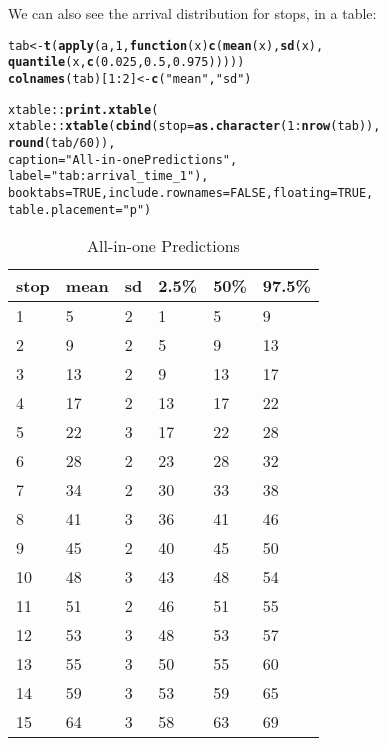 \documentclass[11pt]{article}\usepackage[]{graphicx}\usepackage[]{color}
\makeatletter
\newcommand{\hlnum}[1]{\textcolor[rgb]{0.686,0.059,0.569}{#1}}%
\newcommand{\hlstr}[1]{\textcolor[rgb]{0.192,0.494,0.8}{#1}}%
\newcommand{\hlopt}[1]{\textcolor[rgb]{0,0,0}{#1}}%
\newcommand{\hlstd}[1]{\textcolor[rgb]{0.345,0.345,0.345}{#1}}%
\newcommand{\hlkwa}[1]{\textcolor[rgb]{0.161,0.373,0.58}{\textbf{#1}}}%
\newcommand{\hlkwb}[1]{\textcolor[rgb]{0.69,0.353,0.396}{#1}}%
\newcommand{\hlkwc}[1]{\textcolor[rgb]{0.333,0.667,0.333}{#1}}%
\newcommand{\hlkwd}[1]{\textcolor[rgb]{0.737,0.353,0.396}{\textbf{#1}}}%
\newenvironment{kframe}{%
 \def\at@end@of@kframe{}%
 \ifinner\ifhmode%
  \def\at@end@of@kframe{\end{minipage}}%
  \begin{minipage}{\columnwidth}%
 \fi\fi%
 \def\FrameCommand##1{\hskip\@totalleftmargin \hskip-\fboxsep
 \colorbox{shadecolor}{##1}\hskip-\fboxsep
     \hskip-\linewidth \hskip-\@totalleftmargin \hskip\columnwidth}%
 \MakeFramed {\advance\hsize-\width
   \@totalleftmargin\z@ \linewidth\hsize
   \@setminipage}}%
 {\par\unskip\endMakeFramed%
 \at@end@of@kframe}
\makeatother
\begin{document}
We can also see the arrival distribution for stops, in a table:
\begin{kframe}
\begin{alltt}
\hlstd{tab} \hlkwb{<-} \hlkwd{t}\hlstd{(}\hlkwd{apply}\hlstd{(a,} \hlnum{1}\hlstd{,} \hlkwa{function}\hlstd{(}\hlkwc{x}\hlstd{)} \hlkwd{c}\hlstd{(}\hlkwd{mean}\hlstd{(x),} \hlkwd{sd}\hlstd{(x),}
                                   \hlkwd{quantile}\hlstd{(x,} \hlkwd{c}\hlstd{(}\hlnum{0.025}\hlstd{,} \hlnum{0.5}\hlstd{,} \hlnum{0.975}\hlstd{)))))}
\hlkwd{colnames}\hlstd{(tab)[}\hlnum{1}\hlopt{:}\hlnum{2}\hlstd{]} \hlkwb{<-} \hlkwd{c}\hlstd{(}\hlstr{"mean"}\hlstd{,} \hlstr{"sd"}\hlstd{)}

\hlstd{xtable}\hlopt{::}\hlkwd{print.xtable}\hlstd{(}
    \hlstd{xtable}\hlopt{::}\hlkwd{xtable}\hlstd{(}\hlkwd{cbind}\hlstd{(}\hlkwc{stop} \hlstd{=} \hlkwd{as.character}\hlstd{(}\hlnum{1}\hlopt{:}\hlkwd{nrow}\hlstd{(tab)),}
                         \hlkwd{round}\hlstd{(tab} \hlopt{/} \hlnum{60}\hlstd{)),}
                   \hlkwc{caption} \hlstd{=} \hlstr{"All-in-one Predictions"}\hlstd{,}
                   \hlkwc{label} \hlstd{=} \hlstr{"tab:arrival_time_1"}\hlstd{),}
    \hlkwc{booktabs} \hlstd{=} \hlnum{TRUE}\hlstd{,} \hlkwc{include.rownames} \hlstd{=} \hlnum{FALSE}\hlstd{,} \hlkwc{floating} \hlstd{=} \hlnum{TRUE}\hlstd{,}
    \hlkwc{table.placement} \hlstd{=} \hlstr{"p"}\hlstd{)}
\end{alltt}
\end{kframe}%
\begin{table}[p]
\centering
\begin{tabular}{llllll}
  \toprule
stop & mean & sd & 2.5\% & 50\% & 97.5\% \\ 
  \midrule
1 & 5 & 2 & 1 & 5 & 9 \\ 
  2 & 9 & 2 & 5 & 9 & 13 \\ 
  3 & 13 & 2 & 9 & 13 & 17 \\ 
  4 & 17 & 2 & 13 & 17 & 22 \\ 
  5 & 22 & 3 & 17 & 22 & 28 \\ 
  6 & 28 & 2 & 23 & 28 & 32 \\ 
  7 & 34 & 2 & 30 & 33 & 38 \\ 
  8 & 41 & 3 & 36 & 41 & 46 \\ 
  9 & 45 & 2 & 40 & 45 & 50 \\ 
  10 & 48 & 3 & 43 & 48 & 54 \\ 
  11 & 51 & 2 & 46 & 51 & 55 \\ 
  12 & 53 & 3 & 48 & 53 & 57 \\ 
  13 & 55 & 3 & 50 & 55 & 60 \\ 
  14 & 59 & 3 & 53 & 59 & 65 \\ 
  15 & 64 & 3 & 58 & 63 & 69 \\ 
   \bottomrule
\end{tabular}
\caption{All-in-one Predictions} 
\label{tab:arrival_time_1}
\end{table}
\end{document}
